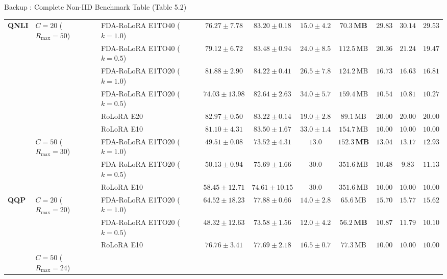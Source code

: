 \documentclass[aspectratio=169]{beamer}
\begin{document}
\begin{frame}[noframenumbering, label=backup_noniid_table]{Backup : Complete Non-IID Benchmark Table (Table 5.2)}
{\begin{tabular}{lllccccccc}
        \multirow{9}{*}{\textbf{QNLI}} 
        & \multirow{6}{*}{$C=20$ ($R_{\max}=50$)} 
        & FDA-RoLoRA E1TO40 ($k=1.0$) & $76.27 \pm 7.78$ & $83.20 \pm 0.18$ & $\mathbf{15.0 \pm 4.2}$ & $\mathbf{70.3\,\text{MB}}$ & $29.83$ & $30.14$ & $29.53$ \\
        & & FDA-RoLoRA E1TO40 ($k=0.5$) & $79.12 \pm 6.72$ & $83.48 \pm 0.94$ & $24.0 \pm 8.5$ & $112.5\,\text{MB}$ & $20.36$ & $21.24$ & $19.47$ \\
        & & FDA-RoLoRA E1TO20 ($k=1.0$) & $81.88 \pm 2.90$ & $\mathbf{84.22 \pm 0.41}$ & $26.5 \pm 7.8$ & $124.2\,\text{MB}$ & $16.73$ & $16.63$ & $16.81$ \\
        & & FDA-RoLoRA E1TO20 ($k=0.5$) & $74.03 \pm 13.98$ & $82.64 \pm 2.63$ & $34.0 \pm 5.7$ & $159.4\,\text{MB}$ & $10.54$ & $10.81$ & $10.27$ \\
        & & RoLoRA E20 & $\mathbf{82.97 \pm 0.50}$ & $83.22 \pm 0.14$ & $19.0 \pm 2.8$ & $89.1\,\text{MB}$ & $20.00$ & $20.00$ & $20.00$ \\
        & & RoLoRA E10 & $81.10 \pm 4.31$ & $83.50 \pm 1.67$ & $33.0 \pm 1.4$ & $154.7\,\text{MB}$ & $10.00$ & $10.00$ & $10.00$ \\
        \cmidrule{2-10}
        & \multirow{3}{*}{$C=50$ ($R_{\max}=30$)} 
        & FDA-RoLoRA E1TO20 ($k=1.0$) & $49.51 \pm 0.08$ & $73.52 \pm 4.31$ & $\mathbf{13.0}$ & $\mathbf{152.3\,\text{MB}}$ & $13.04$ & $13.17$ & $12.93$ \\
        & & FDA-RoLoRA E1TO20 ($k=0.5$) & $50.13 \pm 0.94$ & $\mathbf{75.69 \pm 1.66}$ & $30.0$ & $351.6\,\text{MB}$ & $10.48$ & $9.83$ & $11.13$ \\
        & & RoLoRA E10 & $\mathbf{58.45 \pm 12.71}$ & $74.61 \pm 10.15$ & $30.0$ & $351.6\,\text{MB}$ & $10.00$ & $10.00$ & $10.00$ \\
        \midrule
        \multirow{6}{*}{\textbf{QQP}} 
        & \multirow{3}{*}{$C=20$ ($R_{\max}=20$)} 
        & FDA-RoLoRA E1TO20 ($k=1.0$) & $64.52 \pm 18.23$ & $\mathbf{77.88 \pm 0.66}$ & $14.0 \pm 2.8$ & $65.6\,\text{MB}$ & $15.70$ & $15.77$ & $15.62$ \\
        & & FDA-RoLoRA E1TO20 ($k=0.5$) & $48.32 \pm 12.63$ & $73.58 \pm 1.56$ & $\mathbf{12.0 \pm 4.2}$ & $\mathbf{56.2\,\text{MB}}$ & $10.87$ & $11.79$ & $10.10$ \\
        & & RoLoRA E10 & $\mathbf{76.76 \pm 3.41}$ & $77.69 \pm 2.18$ & $16.5 \pm 0.7$ & $77.3\,\text{MB}$ & $10.00$ & $10.00$ & $10.00$ \\
        \cmidrule{2-10}
        & \multirow{3}{*}{$C=50$ ($R_{\max}=24$)} 

\end{tabular}}
\end{frame}
\end{document}
